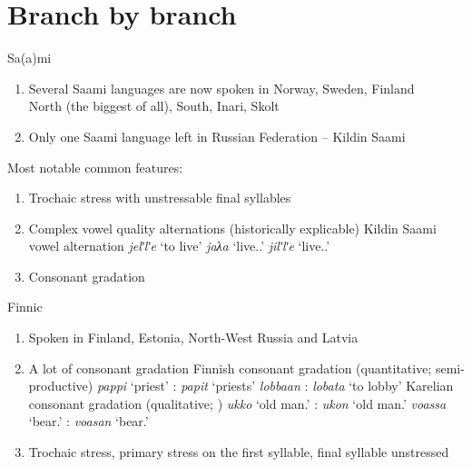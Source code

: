 \documentclass[10 pt, handout]{beamer}
\begin{document}
	\section{Branch by branch}

\begin{frame}{Sa(a)mi}

	\begin{enumerate}[$\gg$]
		\item Several Saami languages are now spoken in Norway, Sweden, Finland\\
			North (the biggest of all), South, Inari, Skolt
		\item Only one Saami language left in Russian Federation -- Kildin Saami
	\end{enumerate}
	Most notable common features:

	\begin{enumerate}[$\gg$]
		\item Trochaic stress with unstressable final syllables
		\item Complex vowel quality alternations (historically explicable)
			\pex Kildin Saami vowel alternation \parencite{kert1971}
				\a \emph{jelʹlʹe} \hfill `to live'
				\a \emph{jaλa} \hfill `live.{\Prs}.{\Fsg}'
				\a \emph{jilʹlʹe} \hfill `live.{\Impf}.{\Fsg}'
			\xe
		\item Consonant gradation
	\end{enumerate}

\end{frame}

\begin{frame}{Finnic}

	\begin{enumerate}[$\gg$]
		\item Spoken in Finland, Estonia, North-West Russia and Latvia
		\item A lot of consonant gradation
			\pex Finnish consonant gradation (quantitative; semi-productive)
				\a \emph{pappi} `priest' : \emph{papit} `priests'
				\a \emph{lobbaan} : \emph{lobata} `to lobby'
			\xe
			\pex Karelian consonant gradation (qualitative; \cite{})
				\a \emph{ukko} `old man.{\Nom}' : \emph{ukon} `old man.{\Gen}'
				\a \emph{voassa} `bear.{\Nom}' : \emph{voasan} `bear.{\Gen}'
			\xe
		\item Trochaic stress, primary stress on the first syllable, final syllable unstressed
	\end{enumerate}

\end{frame}
\end{document}
